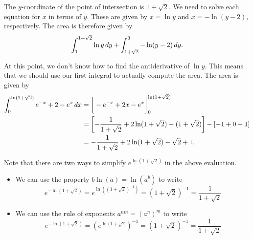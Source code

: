\documentclass[]{ximera}
\begin{document}
\begin{freeResponse}
\begin{image}
\end{image}

The $y$-coordinate of the point of intersection is $1+\sqrt{2}$. We need to solve each equation for $x$ in terms of $y$. These are given by $x=\ln y$ and $x=-\ln(y-2)$, respectively. The area is therefore given by
$$
\int_1^{1+\sqrt{2}} \ln y \mathop{}\!d y + \int_{1+\sqrt{2}}^3 -\ln(y-2) \mathop{}\!d y.
$$

At this point, we don't know how to find the antiderivative of $\ln y$. This means that we should use our first integral to actually compute the area. The area is given by
\begin{align*}
\int_0^{\ln (1+ \sqrt{2})} e^{-x}+2-e^x \mathop{}\!d x &= \bigg[ -e^{-x} + 2x - e^x \bigg]_0^{\ln(1+\sqrt{2})} \\
&= \left[-\frac{1}{1+\sqrt{2}} + 2\ln(1+\sqrt{2}) - (1+ \sqrt{2})\right] - \left[ -1+0-1\right] \\
&= -\frac{1}{1+\sqrt{2}} + 2\ln(1+\sqrt{2})  - \sqrt{2} + 1.
\end{align*}

Note that there are two ways to simplify $e^{\ln (1+ \sqrt{2})}$ in the above evaluation.

\begin{itemize}
\item We can use the property $b \ln(a) = \ln(a^b)$ to write
\[
e^{-\ln (1+ \sqrt{2})}=e^{\ln \left((1+ \sqrt{2})^{-1}\right)} = (1+\sqrt{2})^{-1} = \frac{1}{1+\sqrt{2}}
\]
\item We can use the rule of exponents $a^{nm} = \left(a^n\right)^m$ to write
\[
e^{-\ln (1+ \sqrt{2})}=\left(e^{\ln(1+ \sqrt{2}}\right)^{-1} = (1+\sqrt{2})^{-1} = \frac{1}{1+\sqrt{2}}
\]
\end{itemize}


\end{freeResponse}
\end{document}
